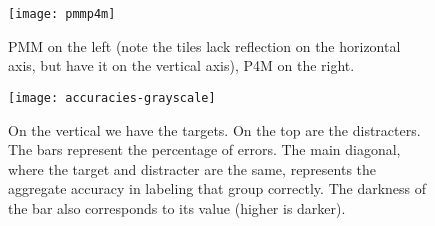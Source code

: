 \begin{figure}[!ht]
\centering
\texttt{[image: pmmp4m]}
\caption{PMM on the left (note the tiles lack reflection on the horizontal axis, but have it on the vertical axis), P4M on the right.}
\label{pmmp4m}
\end{figure}

\begin{figure}[!ht]
\centering
\texttt{[image: accuracies-grayscale]}
\caption{On the vertical we have the targets. On the top are the distracters. The bars represent the percentage of errors. The main diagonal, where the target and distracter are the same, represents the aggregate accuracy in labeling that group correctly. The darkness of the bar also corresponds to its value (higher is darker).}
\label{fullacc}
\end{figure}